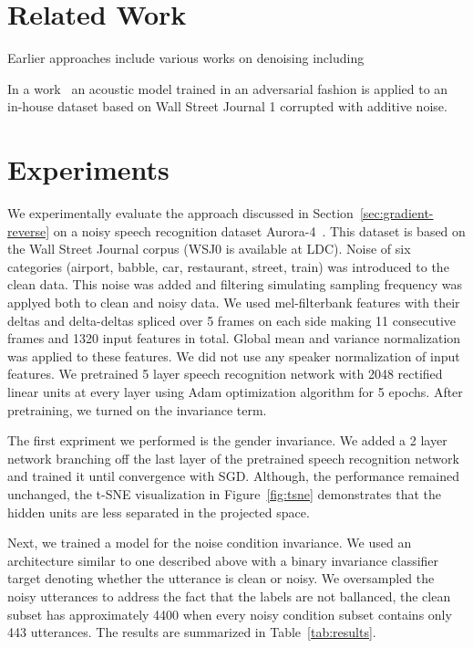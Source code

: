 \documentclass{article}
\begin{document}
\section{Related Work}
    Earlier approaches include various works on denoising including

    In a work~\cite{yusuke2016adversarial} an acoustic model trained in an adversarial fashion is
    applied to an in-house dataset based on Wall Street Journal 1 corrupted with additive noise.
    

\section{Experiments}
We experimentally evaluate the approach discussed in Section~\ref{sec:gradient-reverse} 
on a noisy speech recognition dataset Aurora-4~\cite{parihar2002aurora}. This dataset
is based on the Wall Street Journal corpus (WSJ0 is available at LDC). Noise of 
six categories (airport, babble, car, restaurant, street, train) was introduced to the 
clean data. This noise was added and filtering simulating sampling frequency was applyed 
both to clean and noisy data. 
We used mel-filterbank features with their deltas and delta-deltas spliced
over 5 frames on each side making 11 consecutive frames and 1320 input features in total. 
Global mean and variance normalization was applied to these features.
We did not use any speaker normalization of input features. We pretrained 5 layer
speech recognition network with 2048 rectified linear units at every layer using Adam 
optimization algorithm for 5 epochs. After pretraining, we turned on the invariance term.

The first expriment we performed is the gender invariance. We added a 2 layer network 
branching off the last layer of the pretrained speech recognition network and 
trained it until convergence with SGD. Although, the performance remained unchanged,
the t-SNE visualization in Figure~\ref{fig:tsne} demonstrates that the hidden units
are less separated in the projected space.

Next, we trained a model for the noise condition invariance. We used an architecture
similar to one described above with a binary invariance classifier target denoting 
whether the utterance is clean or noisy. We oversampled the noisy utterances to 
address the fact that the labels are not ballanced, the clean subset has approximately 4400
when every noisy condition subset contains only 443 utterances. The results are
summarized in Table~\ref{tab:results}.
\end{document}
